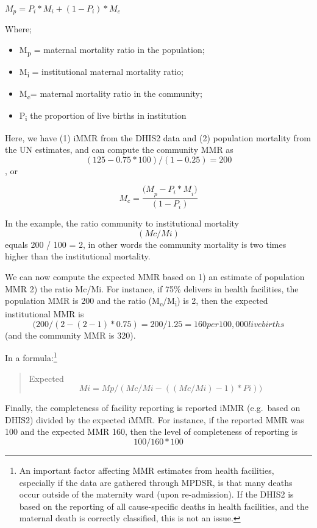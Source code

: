 \documentclass[
  english,
  letterpaper,
  DIV=11,
  numbers=noendperiod]{scrreprt}
\providecommand{\tightlist}{%
  \setlength{\itemsep}{0pt}\setlength{\parskip}{0pt}}
\begin{document}
\(M_{p} = P_{i}*M_{i} + \left( 1 - P_{i} \right)*M_{c}\)

Where;

\begin{itemize}
\tightlist
\item
  M\textsubscript{p} = maternal mortality ratio in the population;
\item
  M\textsubscript{i} = institutional maternal mortality ratio;
\item
  M\textsubscript{c}= maternal mortality ratio in the community;
\item
  P\textsubscript{i} the proportion of live births in institution
\end{itemize}

Here, we have (1) iMMR from the DHIS2 data and (2) population mortality
from the UN estimates, and can compute the community MMR as
\[(125 - 0.75 * 100) / (1-0.25) = 200 \], or

\[ M_{c} =  \frac{{(M}_{p} - {P_{i}*M}_{i})}{(1 - P_{i})}\]

In the example, the ratio community to institutional mortality
\[(Mc/Mi) \]equals 200 / 100 = 2, in other words the community mortality
is two times higher than the institutional mortality.

We can now compute the expected MMR based on 1) an estimate of
population MMR 2) the ratio Mc/Mi. For instance, if 75\% delivers in
health facilities, the population MMR is 200 and the ratio
(M\textsubscript{c}/M\textsubscript{i}) is 2, then the expected
institutional MMR is
\[ (200/(2-(2-1)*0.75) = 200 / 1.25 = 160 per 100,000 live births \]
(and the community MMR is 320).

In a formula:\footnote{An important factor affecting MMR estimates from
  health facilities, especially if the data are gathered through MPDSR,
  is that many deaths occur outside of the maternity ward (upon
  re-admission). If the DHIS2 is based on the reporting of all
  cause-specific deaths in health facilities, and the maternal death is
  correctly classified, this is not an issue.}

\begin{quote}
Expected \[Mi =Mp / (Mc/Mi -((Mc/Mi)-1) * Pi))\]
\end{quote}

Finally, the completeness of facility reporting is reported iMMR
(e.g.~based on DHIS2) divided by the expected iMMR. For instance, if the
reported MMR was 100 and the expected MMR 160, then the level of
completeness of reporting is \[100/160 * 100%
\]
\end{document}
